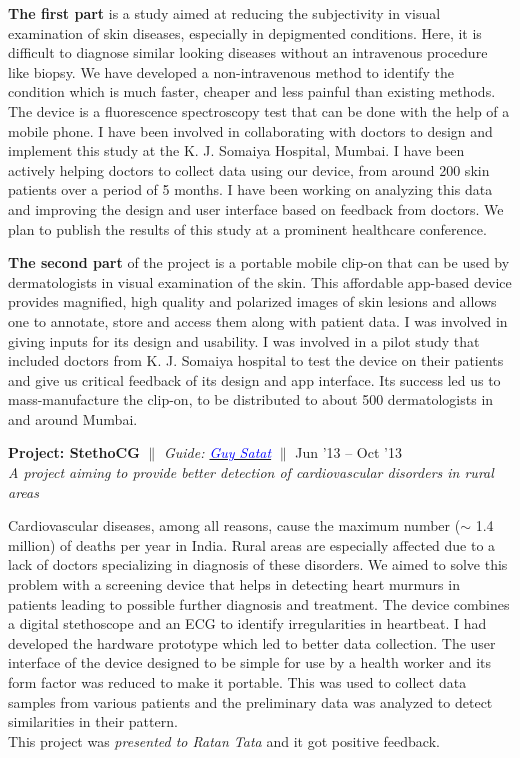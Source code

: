\documentclass[margin,line]{res}
\newenvironment{list1}{
  \begin{list}{\ding{113}}{%
      \setlength{\itemsep}{0in}
      \setlength{\parsep}{0in} \setlength{\parskip}{0in}
      \setlength{\topsep}{0in} \setlength{\partopsep}{0in} 
      \setlength{\leftmargin}{0.17in}}}{\end{list}}
\begin{document}
\begin{resume}
\begin{list1}
\noindent \textbf{The first part} is a study aimed at reducing the subjectivity in visual examination of skin diseases, especially in depigmented conditions. Here, it is difficult to diagnose similar looking diseases without an intravenous procedure like biopsy. We have developed a non-intravenous method to identify the condition which is much faster, cheaper and less painful than existing methods. The device is a fluorescence spectroscopy test that can be done with the help of a mobile phone. I have been involved in collaborating with doctors to design and implement this study at the K. J. Somaiya Hospital, Mumbai. I have been actively helping doctors to collect data using our device, from around 200 skin patients over a period of 5 months. I have been working on analyzing this data and improving the design and user interface based on feedback from doctors. We plan to publish the results of this study at a prominent healthcare conference.
\vspace{4pt}

\noindent \textbf{The second part} of the project is a portable mobile clip-on that can be used by dermatologists in visual examination of the skin. This affordable app-based device provides magnified, high quality and polarized images of skin lesions and allows one to annotate, store and access them along with patient data. I was involved in giving inputs for its design and usability. I was involved in a pilot study that included doctors from K. J. Somaiya hospital to test the device on their patients and give us critical feedback of its design and app interface. Its success led us to mass-manufacture the clip-on, to be distributed to about 500 dermatologists in and around Mumbai. \\
\vspace*{-.05in}

\item[]\textbf{Project: StethoCG} \hfill $\|$ \hfill {\em Guide: \href{http://web.media.mit.edu/~guysatat/}{\textcolor{blue} {Guy Satat}}} \hfill $\|$ \hfill {Jun '13 -- Oct '13} \\
\textit{A project aiming to provide better detection of cardiovascular disorders in rural areas}
\vspace{4pt}

\noindent Cardiovascular diseases, among all reasons, cause the maximum number ($\sim$ 1.4 million) of deaths per year in India. Rural areas are especially affected due to a lack of doctors specializing in diagnosis of these disorders. We aimed to solve this problem with a screening device that helps in detecting heart murmurs in patients leading to possible further diagnosis and treatment. The device combines a digital stethoscope and an ECG to identify irregularities in heartbeat. I had developed the hardware prototype which led to better data collection. The user interface of the device designed to be simple for use by a health worker and its form factor was reduced to make it portable. This was used to collect data samples from various patients and the preliminary data was analyzed to detect similarities in their pattern.\\ 
This project was \textit{presented to Ratan Tata} and it got positive feedback.


\end{list1}
\end{resume}
\end{document}
